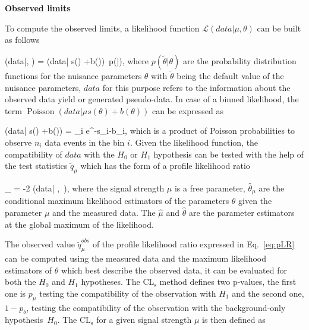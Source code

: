 \textbf{Observed limits}

To compute the observed limits, a likelihood function $\mathcal{L}(data|\mu, \theta)$ can be built as follows~\cite{CMS-NOTE-2011-005}

{
(data|\mu, \theta) = (data| \mu s(\theta) +b(\theta))~p(\tilde{\theta}|\theta),
}
where $p(\tilde{\theta}|\theta)$ are the probability distribution functions for the nuisance parameters $\theta$ with $\tilde{\theta}$ being the default value of the nuisance parameters, $data$ for this purpose refers to the information about the observed data yield or generated pseudo-data. In case of a binned likelihood, the term $\operatorname{Poisson}(data| \mu s(\theta) +b(\theta))$ can be expressed as


{
(data| \mu s(\theta) +b(\theta))  = \prod_{i}  e^{-\mu s_{i}-b_{i}},
}
which is a product  of Poisson probabilities to observe $n_{i}$ data events in the bin $i$. Given the likelihood function, the compatibility of $data$ with the $H_{0}$ or $H_{1}$ hypothesis can be tested with the help of the test statistics $\tilde{q}_{\mu}$ which has the form of a profile likelihood ratio

{
_{\mu} = -2   {(data| \hat{\mu} ,~\hat{\theta})},
}
where the signal strength $\mu$ is a free parameter, $\hat{\theta}_{\mu}$ are the conditional maximum likelihood estimators of the parameters $\theta$ given the parameter $\mu$ and the measured data. The $\hat{\mu}$ and $\hat{\theta}$ are the parameter estimators at the global maximum of the likelihood. 
	  
The observed value $\tilde{q}_{\mu}^{obs}$ of the profile likelihood ratio expressed in Eq.~\ref{eq:pLR} can be computed using the measured data and the maximum likelihood estimators of $\theta$ which best describe the observed data, it can be evaluated for both the $H_{0}$ and $H_{1}$ hypotheses. The $\mathrm{CL_{s}}$  method defines two p-values, the first one is $p_{\mu}$ testing the compatibility of the observation with $H_{1}$ and the second one, $1-p_{b}$, testing the compatibility of the observation with the background-only hypothesis~$H_{0}$. The $\mathrm{CL_{s}}$ for a given signal strength $\mu$ is then defined as

